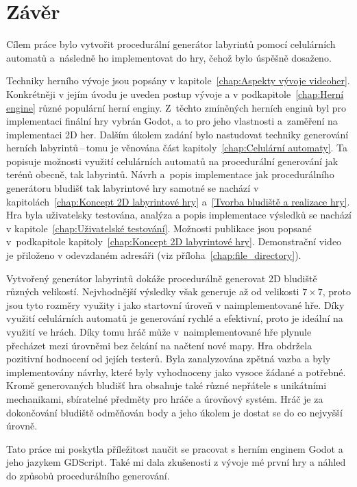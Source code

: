 \chapter{Závěr}\label{chap:Závěr}
Cílem práce bylo vytvořit procedurální generátor labyrintů pomocí celulárních automatů a~následně ho implementovat do hry, čehož bylo úspěšně dosaženo.

Techniky herního vývoje jsou popsány v kapitole~\ref{chap:Aspekty vývoje videoher}. Konkrétněji v jejím úvodu je uveden postup vývoje a v podkapitole~\ref{chap:Herní engine} různé populární herní enginy. Z~těchto zmíněných herních enginů byl pro implementaci finální hry vybrán Godot, a to pro jeho vlastnosti a~zaměření na implementaci 2D her. Dalším úkolem zadání bylo nastudovat techniky generování herních labyrintů\,--\,tomu je věnována část kapitoly~\ref{chap:Celulární automaty}. Ta popisuje možnosti využití celulárních automatů na procedurální generování jak terénů obecně, tak labyrintů. Návrh a~popis implementace jak procedurálního generátoru bludišť tak labyrintové hry samotné se nachází v kapitolách~\ref{chap:Koncept 2D labyrintové hry} a~\ref{Tvorba bludiště a realizace hry}. Hra byla uživatelsky testována, analýza a popis implementace výsledků se nachází v kapitole~\ref{chap:Uživatelské testování}. Možnosti publikace jsou popsané v~podkapitole  kapitoly~\ref{chap:Koncept 2D labyrintové hry}. Demonstrační video je přiloženo v odevzdaném adresáři (viz příloha~\ref{chap:file_directory}).

Vytvořený generátor labyrintů dokáže procedurálně generovat 2D bludiště různých velikostí. Nejvhodnější výsledky však generuje až od velikosti $7 \times 7$, proto jsou tyto rozměry využity i jako startovní úroveň v naimplementované hře. Díky využití celulárních automatů je generování rychlé a efektivní, proto je ideální na využití ve hrách. Díky tomu hráč může v~naimplementované hře plynule přecházet mezi úrovněmi bez čekání na načtení nové mapy. Hra obdržela pozitivní hodnocení od jejích testerů. Byla zanalyzována zpětná vazba a byly implementovány návrhy, které byly vyhodnoceny jako vysoce žádané a potřebné. Kromě generovaných bludišť hra obsahuje také různé nepřátele s unikátními mechanikami, sbíratelné předměty pro hráče a úrovňový systém. Hráč je za dokončování bludiště odměňován body a jeho úkolem je dostat se do co nejvyšší úrovně.

Tato práce mi poskytla příležitost naučit se pracovat s herním enginem Godot a jeho jazykem GDScript. Také mi dala zkušenosti z vývoje mé první hry a náhled do způsobů procedurálního generování.

